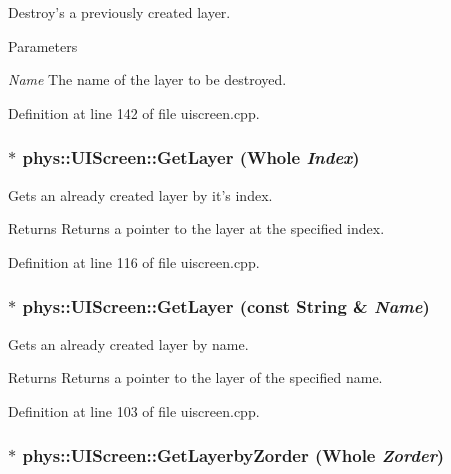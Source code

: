 Destroy's a previously created layer. 


\begin{DoxyParams}{Parameters}
\item[{\em Name}]The name of the layer to be destroyed. \end{DoxyParams}


Definition at line 142 of file uiscreen.cpp.

\hypertarget{classphys_1_1UIScreen_a8b9aeb4599c47d2b4ea0a1c5d5e6f210}{
\subsubsection[{GetLayer}]{ $\ast$ phys::UIScreen::GetLayer ({\bf Whole} {\em Index})}}
\label{d9/de8/classphys_1_1UIScreen_a8b9aeb4599c47d2b4ea0a1c5d5e6f210}


Gets an already created layer by it's index. 

\begin{DoxyReturn}{Returns}
Returns a pointer to the layer at the specified index. 
\end{DoxyReturn}


Definition at line 116 of file uiscreen.cpp.

\hypertarget{classphys_1_1UIScreen_a661f461325f3a67169ce0c4ee107c8eb}{
\subsubsection[{GetLayer}]{ $\ast$ phys::UIScreen::GetLayer (const {\bf String} \& {\em Name})}}
\label{d9/de8/classphys_1_1UIScreen_a661f461325f3a67169ce0c4ee107c8eb}


Gets an already created layer by name. 

\begin{DoxyReturn}{Returns}
Returns a pointer to the layer of the specified name. 
\end{DoxyReturn}


Definition at line 103 of file uiscreen.cpp.

\hypertarget{classphys_1_1UIScreen_ab558b5405a1f64d7558e34a217bfc28d}{
\subsubsection[{GetLayerbyZorder}]{ $\ast$ phys::UIScreen::GetLayerbyZorder ({\bf Whole} {\em Zorder})}}
\label{d9/de8/classphys_1_1UIScreen_ab558b5405a1f64d7558e34a217bfc28d}



